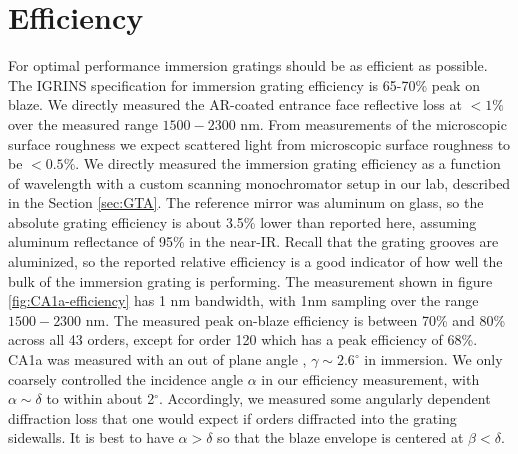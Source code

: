 \section{Efficiency} 
For optimal performance immersion gratings should be as efficient as possible.  The IGRINS specification for immersion grating efficiency is 65-70\% peak on blaze\cite{wang2010}. We directly measured the AR-coated entrance face reflective loss at $<1\%$ over the measured range $1500-2300$ nm.  From measurements of the microscopic surface roughness\cite{wang2010} we expect scattered light from microscopic surface roughness to be $<0.5\%$.  We directly measured the immersion grating efficiency as a function of wavelength with a custom scanning monochromator setup in our lab, described in the Section \ref{sec:GTA}.  The reference mirror was aluminum on glass, so the absolute grating efficiency is about 3.5\% lower than reported here, assuming aluminum reflectance of 95\% in the near-IR.  Recall that the grating grooves are aluminized, so the reported relative efficiency is a good indicator of how well the bulk of the immersion grating is performing.  The measurement shown in figure \ref{fig:CA1a-efficiency} has 1 nm bandwidth, with 1nm sampling over the range $1500-2300$ nm.  The measured peak on-blaze efficiency is between 70\% and 80\% across all 43 orders, except for order 120 which has a peak efficiency of 68\%.  CA1a was measured with an out of plane angle \cite{schroeder1987}, $\gamma \sim 2.6^\circ$ in immersion.  We only coarsely controlled the incidence angle $\alpha$ in our efficiency measurement, with $\alpha \sim \delta$ to within about 2$^\circ$.  Accordingly, we measured some angularly dependent diffraction loss that one would expect if orders diffracted into the grating sidewalls.  It is best to have $\alpha > \delta$ so that the blaze envelope is centered at $\beta < \delta$.


